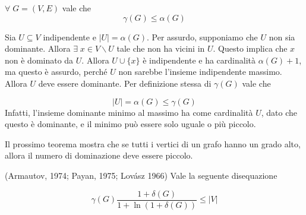 \documentclass[12pt]{report}
\begin{document}
\begin{fatto}
    $\forall  \; G = (V,E)$ vale che 
    $$\gamma(G) \leq \alpha(G)$$
\end{fatto}

\begin{dimo}
    Sia $U \subseteq V$ indipendente e $|U| = \alpha(G)$. Per assurdo, supponiamo che $U$ non sia dominante.  Allora $\exists \;x \in V\backslash U$ tale che non ha vicini in $U$. Questo implica che $x$ non è dominato da $U$. Allora $U \cup \{x\}$ è indipendente e ha cardinalità $\alpha(G) + 1$, ma questo è assurdo, perché $U$ non sarebbe l'insieme indipendente massimo. Allora $U$ deve essere dominante. Per definizione stessa di $\gamma(G)$ vale che 
    
    $$|U| = \alpha(G) \leq \gamma(G)$$
    Infatti, l'insieme dominante minimo al massimo ha come cardinalità $U$, dato che questo è dominante, e il minimo può essere solo uguale o più piccolo.
\end{dimo}

\noindent 
Il prossimo teorema mostra che se tutti i vertici di un grafo hanno un grado alto, allora il numero di dominazione deve essere piccolo.

\begin{teo}
    (Armautov, 1974; Payan, 1975; Lovász 1966)
    Vale la seguente disequazione

    $$\gamma(G) \frac{1 + \delta(G)}{1 + \ln{(1 + \delta(G))}} \leq |V|$$
\end{teo}
\end{document}

